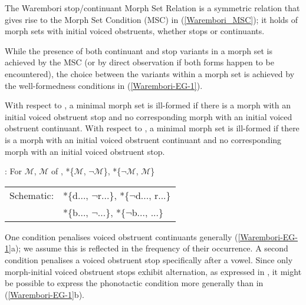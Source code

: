 The Warembori  stop/continuant Morph Set Relation is a symmetric relation that gives rise to the Morph Set Condition (MSC) in (\ref{Warembori_MSC}); it holds of morph sets with initial voiced obstruents, whether stops or continuants. 

While the presence of both continuant and stop variants in a morph set is achieved by the MSC (or by direct observation if both forms happen to be encountered), the choice between the variants within a morph set is achieved by the well-formedness conditions in (\ref{Warembori-EG-1}). 

\begin{whiteshadowbox}
\begin{example} \label{Warembori_MSC}
\ea With respect to \WaremboriMSR, a minimal morph set is ill-formed if there is a morph with an initial voiced obstruent stop and no corresponding morph with an initial voiced obstruent continuant.
\ex With respect to \WaremboriMSR, a minimal morph set is ill-formed if there is a morph with an initial voiced obstruent continuant and no corresponding morph with an initial voiced obstruent stop.
\z

\WaremboriMSC: For $\mathcal{M}$, $\mathcal{M}$ of \WaremboriMSR, *\{$\mathcal{M}$, $\neg$$\mathcal{M}$\}, *\{$\lnot$$\mathcal{M}$, $\mathcal{M}$\}\\\smallskip
\begin{tabular}{ll}
{Schematic}: &*\{d..., $\neg$r...\}, *\{$\lnot$d..., r...\}\\
             &*\{b..., $\neg$\B...\}, *\{$\lnot$b..., \B...\}
             \end{tabular}
\end{example}
\end{whiteshadowbox}

One condition penalises  voiced obstruent  continuants generally (\ref{Warembori-EG-1}a); we assume this is reflected in the frequency of their occurrence. A second condition penalises a voiced obstruent stop specifically after a vowel. Since only morph-initial voiced obstruent stops exhibit alternation, as expressed in \WaremboriMSR, it might be possible to express the phonotactic condition more generally than in (\ref{Warembori-EG-1}b).


